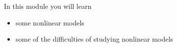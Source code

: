 In this module you will learn
\begin{itemize}
	\item some nonlinear models
	\item some of the difficulties of studying nonlinear models
\end{itemize}

\hfill \\

